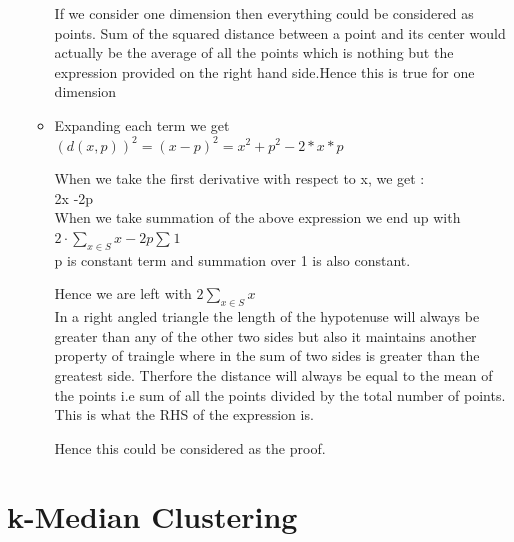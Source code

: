 \documentclass[11pt]{article}
\begin{document}
\begin{itemize}
\begin{itemize}
	If we consider one dimension then everything could be considered as points. Sum of the squared distance between a point and its center would actually be the average of all the points which is nothing but the expression provided on the right hand side.Hence this is true for one dimension
	
	\item Expanding each term we get $(d(x,p))^2 =(x-p)^2 =x^2 +p^2 -2*x*p$
	
	When we take the first derivative with respect to x, we get :\\
	2x -2p \\
	
	When we take summation of the above expression we end up with \\
	$ 2 \cdot \sum_{x \in S}^{} x  -2p \sum_{}^{} 1 $\\
	p is constant term and summation over 1 is also constant.
	
	Hence we are left with  $2\sum_{x \in S}^{} x $\\
	
	In a right angled triangle the length of the hypotenuse will always be greater than any of the other two sides but also it maintains another property of traingle where in the sum of two sides is greater than the greatest side. Therfore the distance will always be equal to the mean of the points i.e sum of all the points divided by the total number of points. This is what the RHS of the expression is.
	
	Hence this could be considered as the proof.
	
\end{itemize}

	
 \end{itemize}
 

\section{k-Median Clustering}
\end{document}
